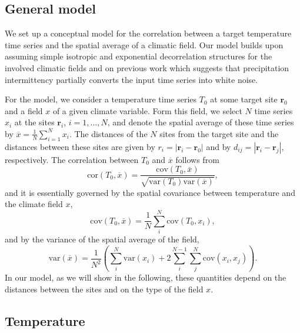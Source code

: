 \documentclass[cp, manuscript]{copernicus}
\begin{document}
\subsection{General model}
\label{app:concept.model.general}

We set up a conceptual model for the correlation between a target temperature
time series and the spatial average of a climatic field. Our model builds upon
assuming simple isotropic and exponential decorrelation structures for the
involved climatic fields and on previous work which suggests that precipitation
intermittency partially converts the input time series into white noise.

For the model, we consider a temperature time series $T_0$ at some target site
$\mathbf{r}_0$ and a field $x$ of a given climate variable. Form this field, we
select $N$ time series $x_i$ at the sites $\mathbf{r}_i$, $i=1,\dotsc,N$, and
denote the spatial average of these time series by
$\overline{x}=\frac{1}{N}\sum_{i=1}^{N}{x_i}$. The distances of the $N$ sites
from the target site and the distances between these sites are given by
$r_i=|\mathbf{r}_i-\mathbf{r}_0|$ and by $d_{ij}=|{\mathbf{r}_i-\mathbf{r}_j}|$,
respectively. The correlation between $T_0$ and $\overline{x}$ follows from
%
\begin{equation}
\label{eq:corr.general}
\mathrm{cor}(T_0,\overline{x})=\frac
{\mathrm{cov}(T_0,\overline{x})}
{\sqrt{\mathrm{var}(T_0)\mathrm{var}(\overline{x})}},
\end{equation}
and it is essentially governed by the spatial covariance between temperature and
the climate field $x$,
%
\begin{equation}
\label{eq:cov.general}
\mathrm{cov}(T_0,\overline{x})=
\frac{1}{N}\sum_{i}^{N}{\mathrm{cov}(T_0,x_i)},
\end{equation}
%
and by the variance of the spatial average of the field,
\begin{equation}
\label{eq:var.general}
\mathrm{var}(\overline{x})=
\frac{1}{N^2}\left(
\sum_{i}^{N}{\mathrm{var}(x_i)} +
2\sum_{i}^{N-1}\sum_{j}^{N}{\mathrm{cov}(x_i,x_j)}
\right).
\end{equation}
%
In our model, as we will show in the following, these quantities depend on the
distances between the sites and on the type of the field $x$.

\subsection{Temperature}
\label{app:concept.model.t2m}
\end{document}
